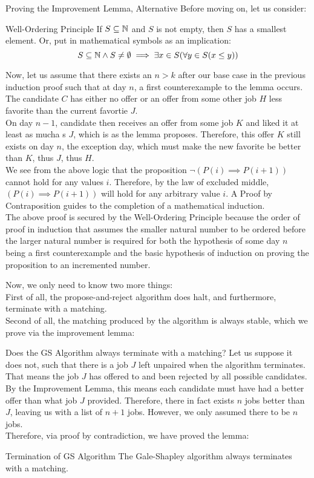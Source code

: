 \begin{ln-think}{Proving the Improvement Lemma, Alternative}{}
    Before moving on, let us consider:
    \begin{ln-define}{Well-Ordering Principle}{}
        If $S \subseteq \mathbb{N}$ and $S$ is not empty, then $S$ has a smallest element. Or, put in mathematical symbols as an implication:
        \[S \subseteq \mathbb{N} \land S \neq \emptyset \implies \exists x \in S (\forall y \in S (x \leq y))\]
    \end{ln-define}
    Now, let us assume that there exists an $n > k$ after our base case in the previous induction proof such that at day $n$, a first counterexample to the lemma occurs. The candidate $C$ has either no offer or an offer from some other job $H$ less favorite than the current favortie $J$. \\
    On day $n - 1$, candidate then receives an offer from some job $K$ and liked it at least as mucha s $J$, which is as the lemma proposes. Therefore, this offer $K$ still exists on day $n$, the exception day, which must make the new favorite be better than $K$, thus $J$, thus $H$. \\
    We see from the above logic that the proposition $\neg (P(i) \implies P(i + 1))$ cannot hold for any values $i$. Therefore, by the law of excluded middle, $(P(i) \implies P(i + 1))$ will hold for any arbitrary value $i$. A Proof by Contraposition guides to the completion of a mathematical induction. \\
    The above proof is secured by the Well-Ordering Principle because the order of proof in induction that assumes the smaller natural number to be ordered before the larger natural number is required for both the hypothesis of some day $n$ being a first counterexample and the basic hypothesis of induction on proving the proposition to an incremented number.
\end{ln-think}
Now, we only need to know two more things: \\
First of all, the propose-and-reject algorithm does halt, and furthermore, terminate with a matching. \\
Second of all, the matching produced by the algorithm is always stable, which we prove via the improvement lemma:
\begin{ln-think}{Does the GS Algorithm always terminate with a matching?}{}
    Let us suppose it does not, such that there is a job $J$ left unpaired when the algorithm terminates. That means the job $J$ has offered to and been rejected by all possible candidates. \\
    By the Improvement Lemma, this means each candidate must have had a better offer than what job $J$ provided. Therefore, there in fact exists $n$ jobs better than $J$, leaving us with a list of $n + 1$ jobs. However, we only assumed there to be $n$ jobs. \\
    Therefore, via proof by contradiction, we have proved the lemma:
    \begin{ln-lemma}{Termination of GS Algorithm}{}
        The Gale-Shapley algorithm always terminates with a matching.
    \end{ln-lemma}
\end{ln-think}
